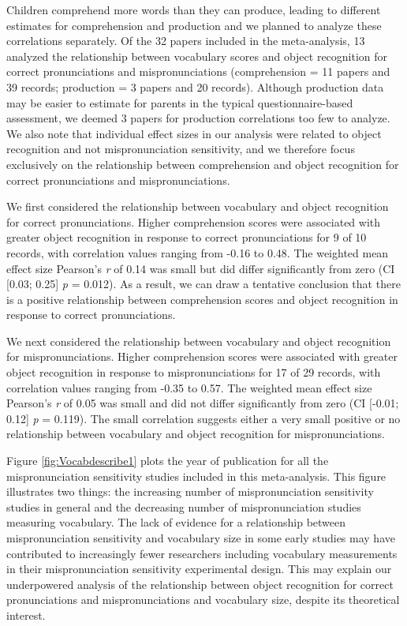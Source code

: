 \documentclass[
  man, noextraspace]{apa6}
\begin{document}
Children comprehend more words than they can produce, leading to different estimates for comprehension and production and we planned to analyze these correlations separately. Of the 32 papers included in the meta-analysis, 13 analyzed the relationship between vocabulary scores and object recognition for correct pronunciations and mispronunciations (comprehension = 11 papers and 39 records; production = 3 papers and 20 records). Although production data may be easier to estimate for parents in the typical questionnaire-based assessment, we deemed 3 papers for production correlations too few to analyze. We also note that individual effect sizes in our analysis were related to object recognition and not mispronunciation sensitivity, and we therefore focus exclusively on the relationship between comprehension and object recognition for correct pronunciations and mispronunciations.

We first considered the relationship between vocabulary and object recognition for correct pronunciations. Higher comprehension scores were associated with greater object recognition in response to correct pronunciations for 9 of 10 records, with correlation values ranging from -0.16 to 0.48. The weighted mean effect size Pearson's \emph{r} of 0.14 was small but did differ significantly from zero (CI {[}0.03; 0.25{]} \emph{p} = 0.012). As a result, we can draw a tentative conclusion that there is a positive relationship between comprehension scores and object recognition in response to correct pronunciations.

We next considered the relationship between vocabulary and object recognition for mispronunciations. Higher comprehension scores were associated with greater object recognition in response to mispronunciations for 17 of 29 records, with correlation values ranging from -0.35 to 0.57. The weighted mean effect size Pearson's \emph{r} of 0.05 was small and did not differ significantly from zero (CI {[}-0.01; 0.12{]} \emph{p} = 0.119). The small correlation suggests either a very small positive or no relationship between vocabulary and object recognition for mispronunciations.

Figure \ref{fig:Vocabdescribe1} plots the year of publication for all the mispronunciation sensitivity studies included in this meta-analysis. This figure illustrates two things: the increasing number of mispronunciation sensitivity studies in general and the decreasing number of mispronunciation studies measuring vocabulary. The lack of evidence for a relationship between mispronunciation sensitivity and vocabulary size in some early studies may have contributed to increasingly fewer researchers including vocabulary measurements in their mispronunciation sensitivity experimental design. This may explain our underpowered analysis of the relationship between object recognition for correct pronunciations and mispronunciations and vocabulary size, despite its theoretical interest.
\end{document}
